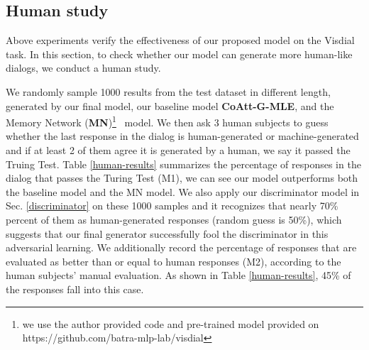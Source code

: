 \documentclass[10pt,twocolumn,letterpaper]{article}
\begin{document}
\subsection{Human study}
Above experiments verify the effectiveness of our proposed model on the Visdial \cite{das2016visual} task. In this section, to check whether our model can generate more human-like dialogs, we conduct a human study.

We randomly sample 1000 results from the test dataset in different length, generated by our final model, our baseline model \textbf{CoAtt-G-MLE}, and the Memory Network (\textbf{MN})\footnote{we use the author provided code and pre-trained model provided on https://github.com/batra-mlp-lab/visdial}~\cite{das2016visual} model. We then ask 3 human subjects to guess whether the last response in the dialog is human-generated or machine-generated and if at least 2 of them agree it is generated by a human, we say it passed the Truing Test. Table \ref{human-results} summarizes the percentage of responses in the dialog that passes the Turing Test (M1), we can see our model outperforms both the baseline model and the MN model. We also apply our discriminator model in Sec. \ref{discriminator} on these 1000 samples and it recognizes that nearly 70\% percent of them as human-generated responses (random guess is 50\%), which suggests that our final generator successfully fool the discriminator in this adversarial learning. We additionally record the percentage of responses that are evaluated as better than or equal to human responses (M2), according to the human subjects' manual evaluation. As shown in Table \ref{human-results}, 45\% of the responses fall into this case.

\begin{table}[t]
\centering
{}
\vspace{-3pt}
\caption{Human evaluation on 1000 sampled responses on VisDial v0.9}
\label{human-results}
\vspace{-10pt}
\end{table}
\end{document}
